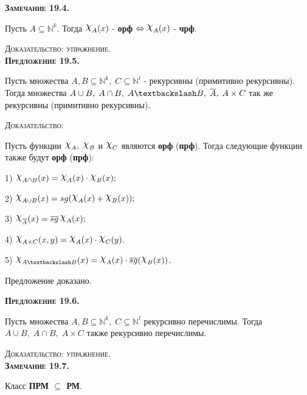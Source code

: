 \documentclass[18pt, a4paper]{extarticle}
\newcommand{\predl}[1]{\textbf{\textsc{Предложение #1}}}
\newcommand{\zam}[1]{\textbf{\textsc{Замечание #1}}}
\newcommand{\dok}{\textsc{Доказательство:}}
\newcommand{\dokup}{\textsc{Доказательство: упражнение.}}
\begin{document}
\zam{19.4.} 

Пусть $A\subseteq\mathbb N^k$. Тогда $\raisebox{.5ex}{\scalebox{1.2}{$\chi$}}_A(x)$ - \textbf{орф} $\Leftrightarrow\raisebox{.5ex}{\scalebox{1.2}{$\chi$}}_A(x)$ - \textbf{чрф}.

\dokup\\

\predl{19.5.}

Пусть множества $A,B\subseteq\mathbb N^k,\;C\subseteq \mathbb N^l$ - рекурсивны (примитивно рекурсивны). Тогда множества $A\cup B,\;A\cap B,\;A\textbackslash B,\;\overline{A},\;A\times C$ так же рекурсивны (примитивно рекурсивны). 

\dok

Пусть функции $\raisebox{.5ex}{\scalebox{1.2}{$\chi$}}_A,\;\raisebox{.5ex}{\scalebox{1.2}{$\chi$}}_B$ и $\raisebox{.5ex}{\scalebox{1.2}{$\chi$}}_C$ являются \textbf{орф} (\textbf{прф}). Тогда следующие функции также будут \textbf{орф} (\textbf{прф}):

1) $\raisebox{.5ex}{\scalebox{1.2}{$\chi$}}_{A\cap B}(x) = \raisebox{.5ex}{\scalebox{1.2}{$\chi$}}_A(x)\cdot \raisebox{.5ex}{\scalebox{1.2}{$\chi$}}_B(x);$

2) $\raisebox{.5ex}{\scalebox{1.2}{$\chi$}}_{A\cup B}(x) = sg(\raisebox{.5ex}{\scalebox{1.2}{$\chi$}}_A(x) + \raisebox{.5ex}{\scalebox{1.2}{$\chi$}}_B(x));$

3) $\raisebox{.5ex}{\scalebox{1.2}{$\chi$}}_{\overline{A}}(x) = \overline{sg}\,\raisebox{.5ex}{\scalebox{1.2}{$\chi$}}_A(x);$

4) $\raisebox{.5ex}{\scalebox{1.2}{$\chi$}}_{A\times C}(x,y) = \raisebox{.5ex}{\scalebox{1.2}{$\chi$}}_A(x)\cdot\raisebox{.5ex}{\scalebox{1.2}{$\chi$}}_C(y)$.

5) $\raisebox{.5ex}{\scalebox{1.2}{$\chi$}}_{A\textbackslash B}(x) = \raisebox{.5ex}{\scalebox{1.2}{$\chi$}}_A(x)\cdot\overline{sg}(\raisebox{.5ex}{\scalebox{1.2}{$\chi$}}_B(x))$.

Предложение доказано.\\\newpage

\predl{19.6.} 

Пусть множества $A,B\subseteq\mathbb N^k,\;C\subseteq \mathbb N^l$ рекурсивно
перечислимы. Тогда $A\cup B,\;A\cap B,\;A\times C$ также рекурсивно перечислимы. 

\dokup\\

\zam{19.7.} 

Класс \textbf{ПРМ $\subseteq$ РМ}.
\end{document}
